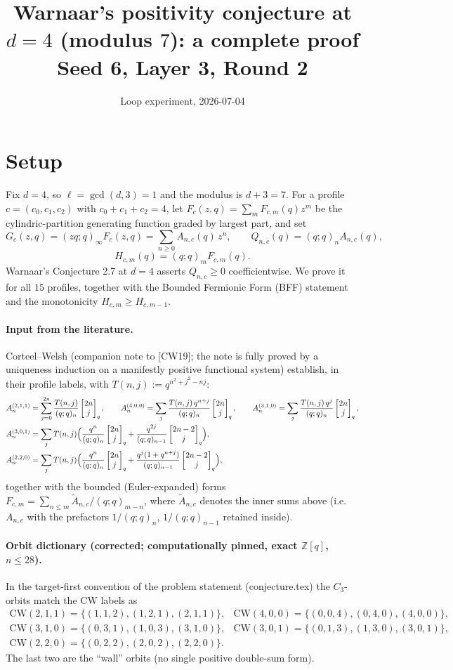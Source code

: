 \documentclass[11pt]{article}
\title{Warnaar's positivity conjecture at $d=4$ (modulus $7$): a complete proof\\
\large Seed 6, Layer 3, Round 2}
\author{Loop experiment, 2026-07-04}
\date{}
\newcommand{\qbin}[2]{\begin{bmatrix}#1\\#2\end{bmatrix}_q}
\newcommand{\poch}[1]{(q;q)_{#1}}
\begin{document}
\maketitle

\section*{Setup}

Fix $d=4$, so $\ell=\gcd(d,3)=1$ and the modulus is $d+3=7$. For a profile
$c=(c_0,c_1,c_2)$ with $c_0+c_1+c_2=4$, let $F_c(z,q)=\sum_m F_{c,m}(q)z^m$ be the
cylindric-partition generating function graded by largest part, and set
\[
G_c(z,q)=(zq;q)_\infty F_c(z,q)=\sum_{n\ge0}A_{n,c}(q)\,z^n,\qquad
Q_{n,c}(q)=\poch{n}A_{n,c}(q),
\]
\[
H_{c,m}(q)=\poch{m}F_{c,m}(q).
\]
Warnaar's Conjecture 2.7 at $d=4$ asserts $Q_{n,c}\ge0$ coefficientwise. We prove it for
all $15$ profiles, together with the Bounded Fermionic Form (BFF) statement and the
monotonicity $H_{c,m}\ge H_{c,m-1}$.

\paragraph{Input from the literature.}
Corteel--Welsh (companion note to [CW19]; the note is fully proved by a uniqueness
induction on a manifestly positive functional system) establish, in their profile labels,
with $T(n,j):=q^{n^2+j^2-nj}$:
\begin{align*}
A_{n}^{(2,1,1)}&=\sum_{j=0}^{2n}\frac{T(n,j)}{\poch{n}}\qbin{2n}{j}, \qquad
A_{n}^{(4,0,0)}=\sum_{j}\frac{T(n,j)\,q^{n+j}}{\poch{n}}\qbin{2n}{j}, \qquad
A_{n}^{(3,1,0)}=\sum_{j}\frac{T(n,j)\,q^{j}}{\poch{n}}\qbin{2n}{j},\\
A_{n}^{(3,0,1)}&=\sum_{j}T(n,j)\Bigl(\frac{q^{n}}{\poch{n}}\qbin{2n}{j}
+\frac{q^{2j}}{\poch{n-1}}\qbin{2n-2}{j}\Bigr),\\
A_{n}^{(2,2,0)}&=\sum_{j}T(n,j)\Bigl(\frac{q^{n}}{\poch{n}}\qbin{2n}{j}
+\frac{q^{j}(1+q^{n+j})}{\poch{n-1}}\qbin{2n-2}{j}\Bigr),
\end{align*}
together with the bounded (Euler-expanded) forms
$F_{c,m}=\sum_{n\le m}\widetilde A_{n,c}/\poch{m-n}$, where $\widetilde A_{n,c}$ denotes
the inner sums above (i.e.\ $A_{n,c}$ with the prefactors $1/\poch{n}$, $1/\poch{n-1}$
retained inside).

\paragraph{Orbit dictionary (corrected; computationally pinned, exact $\mathbb{Z}[q]$, $n\le28$).}
In the target-first convention of the problem statement (conjecture.tex) the
$C_3$-orbits match the CW labels as
\[
\begin{array}{ll}
\mathrm{CW}(2,1,1)=\{(1,1,2),(1,2,1),(2,1,1)\}, &
\mathrm{CW}(4,0,0)=\{(0,0,4),(0,4,0),(4,0,0)\},\\
\mathrm{CW}(3,1,0)=\{(0,3,1),(1,0,3),(3,1,0)\}, &
\mathrm{CW}(3,0,1)=\{(0,1,3),(1,3,0),(3,0,1)\},\\
\mathrm{CW}(2,2,0)=\{(0,2,2),(2,0,2),(2,2,0)\}. &
\end{array}
\]
The last two are the ``wall'' orbits (no single positive double-sum form).
\end{document}
